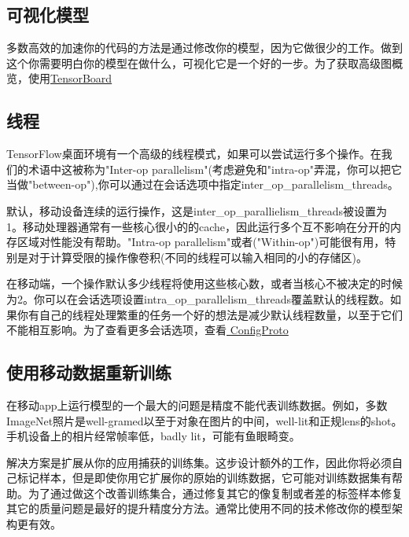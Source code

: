 \subsection{可视化模型}
多数高效的加速你的代码的方法是通过修改你的模型，因为它做很少的工作。做到这个你需要明白你的模型在做什么，可视化它是一个好的一步。为了获取高级图概览，使用\href{https://github.com/tensorflow/tensorboard}{TensorBoard}
\subsection{线程}
TensorFlow桌面环境有一个高级的线程模式，如果可以尝试运行多个操作。在我们的术语中这被称为"Inter-op parallelism"(考虑避免和"intra-op"弄混，你可以把它当做"between-op"),你可以通过在会话选项中指定inter\_op\_parallelism\_threads。

默认，移动设备连续的运行操作，这是inter\_op\_parallielism\_threads被设置为1。移动处理器通常有一些核心很小的的cache，因此运行多个互不影响在分开的内存区域对性能没有帮助。"Intra-op parallelism"或者("Within-op")可能很有用，特别是对于计算受限的操作像卷积(不同的线程可以输入相同的小的存储区)。

在移动端，一个操作默认多少线程将使用这些核心数，或者当核心不被决定的时候为2。你可以在会话选项设置intra\_op\_parallelism\_threads覆盖默认的线程数。如果你有自己的线程处理繁重的任务一个好的想法是减少默认线程数量，以至于它们不能相互影响。为了查看更多会话选项，查看\href{https://www.github.com/tensorflow/tensorflow/blob/r1.4/tensorflow/core/protobuf/config.proto}{ ConfigProto}
\subsection{使用移动数据重新训练}
在移动app上运行模型的一个最大的问题是精度不能代表训练数据。例如，多数ImageNet照片是well-gramed以至于对象在图片的中间，well-lit和正规lens的shot。手机设备上的相片经常帧率低，badly lit，可能有鱼眼畸变。

解决方案是扩展从你的应用捕获的训练集。这步设计额外的工作，因此你将必须自己标记样本，但是即使你用它扩展你的原始的训练数据，它可能对训练数据集有帮助。为了通过做这个改善训练集合，通过修复其它的像复制或者差的标签样本修复其它的质量问题是最好的提升精度分方法。通常比使用不同的技术修改你的模型架构更有效。
